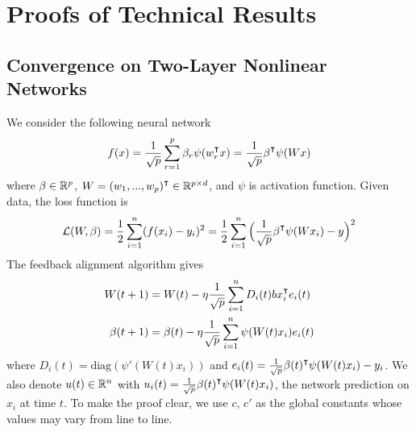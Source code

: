 \section{Proofs of Technical Results}

\subsection{Convergence on Two-Layer Nonlinear Networks}
We consider the following neural network
\begin{equation}
f(x) = \frac{1}{\sqrt p}\sum_{r=1}^p \beta_r \psi(w_r\transpose x) = \frac{1}{\sqrt p}\beta\transpose \psi(Wx)
\end{equation}
where $\beta \in \mathbb{R}^p$, $W = (w_1,...,w_p)\transpose\in\R^{p\times d}$, and $\psi$ is activation function. Given data, the loss function is 
\begin{equation}
\Loss(W, \beta) = \frac{1}{2}\sum_{i=1}^n(f(x_i)-y_i)^2 = \frac{1}{2}\sum_{i=1}^n\Big(\frac{1}{\sqrt p}\beta\transpose \psi(Wx_i)-y\Big)^2
\end{equation}
The feedback alignment algorithm gives
\begin{equation}
\label{eq:updates}
\begin{aligned}
    W(t+1) &= W(t) - \eta\frac{1}{\sqrt p}\sum_{i=1}^nD_i(t)bx_i\transpose e_i(t) \\
    \beta(t+1) &= \beta(t)- \eta \frac{1}{\sqrt p}\sum_{i=1}^n \psi(W(t)x_i)e_i(t)
\end{aligned}
\end{equation}
where $D_i(t) = \text{diag}(\psi'(W(t)x_i))$ and $e_i(t) = \frac{1}{\sqrt p}\beta(t)\transpose \psi(W(t)x_i)-y_i$. We also denote $u(t)\in\mathbb{R}^n$ with $u_i(t) = \frac{1}{\sqrt p}\beta(t)\transpose \psi(W(t)x_i)$, the network prediction on $x_i$ at time $t$. To make the proof clear, we use $c$, $c'$ as the global constants whose values may vary from line to line.



